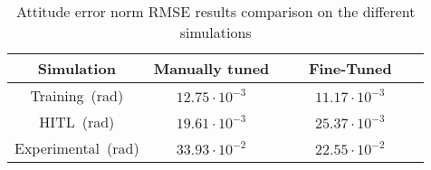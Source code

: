 \begin{table}[h!]
\centering
\caption{Attitude error norm RMSE results comparison on the different simulations}
\label{table:att_norm_errors}
\begin{tabular}{c|c|c}
\textbf{Simulation} & \textbf{ Manually tuned} & \textbf{\ \ \ Fine-Tuned\ \ \ } \\
\hline
Training\ (rad) & $12.75\cdot 10^{-3} $ &  $11.17\cdot 10^{-3}$ \\
HITL\ (rad) & $19.61\cdot 10^{-3}$ & $25.37\cdot 10^{-3}$ \\
Experimental\ (rad) & $33.93\cdot 10^{-2}$ &  $22.55\cdot 10^{-2}$ \\
\end{tabular}
\end{table}